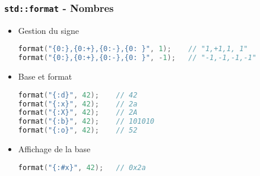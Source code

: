 \documentclass[C++.tex]{subfiles}
\begin{document}
\begin{frame}[fragile]
	\frametitle{\lstinline|std::format| - Nombres}
	\begin{itemize}
		\item Gestion du signe

		\begin{lstlisting}[language=C++]
format("{0:},{0:+},{0:-},{0: }", 1); 	// "1,+1,1, 1"
format("{0:},{0:+},{0:-},{0: }", -1);	// "-1,-1,-1,-1"\end{lstlisting}

		\item Base et format


		\begin{lstlisting}[language=C++]
format("{:d}", 42);    // 42
format("{:x}", 42);    // 2a
format("{:X}", 42);    // 2A
format("{:b}", 42);    // 101010
format("{:o}", 42);    // 52\end{lstlisting}

		\item Affichage de la base

		\begin{lstlisting}[language=C++]
format("{:#x}", 42);   // 0x2a\end{lstlisting}

	\end{itemize}
\end{frame}
\end{document}
